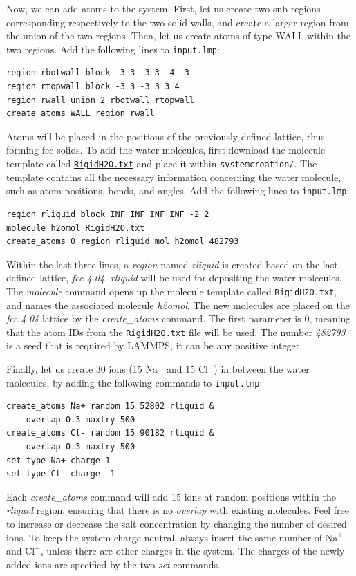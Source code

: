 \documentclass[9pt,tutorial]{livecoms}
\newcommand{\flrcmd}[1]{\textcolor{command}{\texttt{#1}}} %
\newcommand{\flecmd}[1]{\textcolor{command}{\texttt{#1}}} %
\newcommand{\dwlcmd}[1]{\textcolor{download}{\texttt{#1}}} %
\newcommand{\filepath}{https://raw.githubusercontent.com/lammpstutorials/lammpstutorials-article/main/files/}
\begin{document}
Now, we can add atoms to the system. First, let us create two sub-regions corresponding
respectively to the two solid walls, and create a larger region from the union of the
two regions. Then, let us create atoms of type WALL within the two regions. Add the
following lines to \flecmd{input.lmp}:
\begin{lstlisting}
region rbotwall block -3 3 -3 3 -4 -3
region rtopwall block -3 3 -3 3 3 4
region rwall union 2 rbotwall rtopwall
create_atoms WALL region rwall
\end{lstlisting}
Atoms will be placed in the positions of the previously defined lattice, thus
forming fcc solids. To add the water molecules, first download the molecule
template called \href{\filepath tutorial4/RigidH2O.txt}{\dwlcmd{RigidH2O.txt}}
and place it within \flrcmd{systemcreation/}. The template contains all the
necessary information concerning the water molecule, such as atom positions,
bonds, and angles. Add the following lines to \flecmd{input.lmp}:
\begin{lstlisting}
region rliquid block INF INF INF INF -2 2
molecule h2omol RigidH2O.txt
create_atoms 0 region rliquid mol h2omol 482793
\end{lstlisting}
Within the last three lines, a \textit{region} named \textit{rliquid} is
created based on the last defined lattice, \textit{fcc 4.04}. \textit{rliquid}
will be used for depositing the water molecules. The \textit{molecule} command
opens up the molecule template called \flecmd{RigidH2O.txt}, and names the
associated molecule \textit{h2omol}. The new molecules are placed on the
\textit{fcc 4.04} lattice by the \textit{create\_atoms} command. The first
parameter is 0, meaning that the atom IDs from the \flecmd{RigidH2O.txt} file
will be used. The number \textit{482793} is a seed that is required by LAMMPS,
it can be any positive integer.

Finally, let us create 30 ions (15 $\text{Na}^+$ and 15 $\text{Cl}^-$) in between
the water molecules, by adding the following commands to \flecmd{input.lmp}:
\begin{lstlisting}
create_atoms Na+ random 15 52802 rliquid &
    overlap 0.3 maxtry 500
create_atoms Cl- random 15 90182 rliquid &
    overlap 0.3 maxtry 500
set type Na+ charge 1
set type Cl- charge -1
\end{lstlisting}
Each \textit{create\_atoms} command will add 15 ions at random positions
within the \textit{rliquid} region, ensuring that there is no \textit{overlap}
with existing molecules. Feel free to increase or decrease the salt concentration
by changing the number of desired ions. To keep the system charge neutral,
always insert the same number of $\text{Na}^+$ and $\text{Cl}^-$, unless there
are other charges in the system. The charges of the newly added ions are specified
by the two \textit{set} commands.
\end{document}
